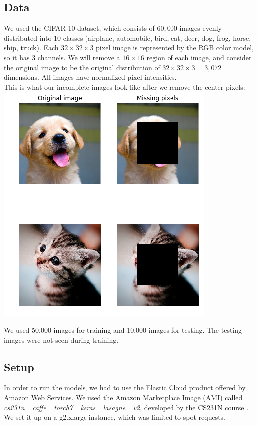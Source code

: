 \documentclass[10pt,twocolumn,letterpaper]{article}
\begin{document}
\subsection{Data}
We used the CIFAR-10 dataset, which consists of $60,000$ images evenly distributed into 10 classes (airplane, automobile, bird, cat, deer, dog, frog, horse, ship, truck). Each $32 \times 32 \times 3$ pixel image is represented by the RGB color model, so it has 3 channels. We will remove a $16 \times 16$ region of each image, and consider the original image to be the original distribution of $32 \times 32 \times 3 = 3,072$ dimensions. All images have normalized pixel intensities. \\

This is what our incomplete images look like after we remove the center pixels:
\includegraphics[width=1.0\linewidth]{img_sample.png}

We used 50,000 images for training and 10,000 images for testing. The testing images were not seen during training.

\subsection{Setup}
In order to run the models, we had to use the Elastic Cloud product offered by Amazon Web Services. We used the Amazon Marketplace Image (AMI) called \textit{cs231n \_caffe \_torch7 \_keras \_lasagne \_v2}, developed by the CS231N course \cite{aws_tutorial}. We set it up on a g2.xlarge instance, which was limited to spot requests. 
\end{document}
